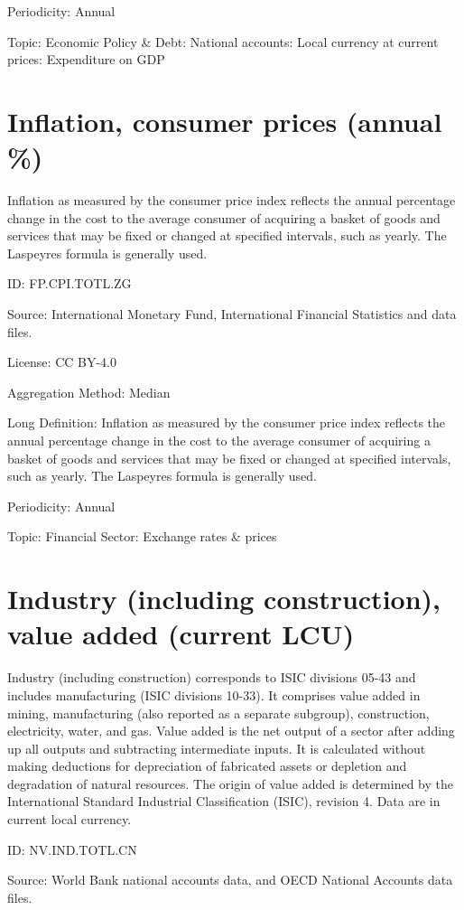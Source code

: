 \documentclass[a4paper]{article}
\begin{document}
Periodicity: Annual

Topic: Economic Policy \& Debt: National accounts: Local currency at current prices: Expenditure on GDP

\section{Inflation, consumer prices (annual \%)}
Inflation as measured by the consumer price index reflects the annual percentage change in the cost to the average consumer of acquiring a basket of goods and services that may be fixed or changed at specified intervals, such as yearly. The Laspeyres formula is generally used.

ID: FP.CPI.TOTL.ZG

Source: International Monetary Fund, International Financial Statistics and data files.

License:  CC BY-4.0 

Aggregation Method: Median

Long Definition: Inflation as measured by the consumer price index reflects the annual percentage change in the cost to the average consumer of acquiring a basket of goods and services that may be fixed or changed at specified intervals, such as yearly. The Laspeyres formula is generally used.

Periodicity: Annual

Topic: Financial Sector: Exchange rates \& prices

\section{Industry (including construction), value added (current LCU)}
Industry (including construction) corresponds to ISIC divisions 05-43 and includes manufacturing (ISIC divisions 10-33). It comprises value added in mining, manufacturing (also reported as a separate subgroup), construction, electricity, water, and gas. Value added is the net output of a sector after adding up all outputs and subtracting intermediate inputs. It is calculated without making deductions for depreciation of fabricated assets or depletion and degradation of natural resources. The origin of value added is determined by the International Standard Industrial Classification (ISIC), revision 4. Data are in current local currency.

ID: NV.IND.TOTL.CN

Source: World Bank national accounts data, and OECD National Accounts data files.
\end{document}
